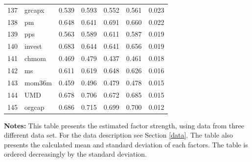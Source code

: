\begin{footnotesize}
\begin{longtable}{rl|c|c|c|c|c}
		137 & grcapx & 0.539 & 0.593 & 0.552 & 0.561 & 0.023 \\ 
		138 & pm & 0.648 & 0.641 & 0.691 & 0.660 & 0.022 \\ 
		139 & pps & 0.563 & 0.589 & 0.611 & 0.587 & 0.019 \\ 
		140 & invest & 0.683 & 0.644 & 0.641 & 0.656 & 0.019 \\ 
		141 & chmom & 0.469 & 0.479 & 0.437 & 0.461 & 0.018 \\ 
		142 & ms & 0.611 & 0.619 & 0.648 & 0.626 & 0.016 \\ 
		143 & mom36m & 0.459 & 0.496 & 0.479 & 0.478 & 0.015 \\ 
		144 & UMD & 0.678 & 0.706 & 0.672 & 0.685 & 0.015 \\ 
		145 & orgcap & 0.686 & 0.715 & 0.699 & 0.700 & 0.012 \\ 
		\hline
		
	\end{longtable}

			\begin{minipage}{0.97\textwidth}
	{\footnotesize {\bf Notes:} This table presents the estimated factor strength, using data from three different data set. For the data description see Section \ref{data}. 
	The table also presents the calculated mean and standard deviation of each factors. 
The table is ordered decreasingly by the standard deviation. }
\end{minipage}
\end{footnotesize}




\newpage

